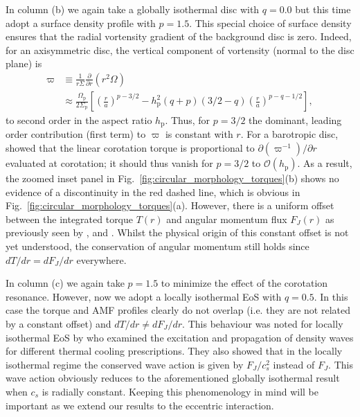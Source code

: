 In column (b) we again take a globally isothermal disc with $q = 0.0$ but this time adopt a surface density profile with $p = 1.5$. This special choice of surface density ensures that the radial vortensity gradient of the background disc is zero. Indeed, for an axisymmetric disc, the vertical component of vortensity (normal to the disc plane) is 
%
\begin{align}
\label{eq:vortensity}
    \varpi &\equiv \frac{1}{r\Sigma}\frac{\partial}{\partial r}\left(r^2 \Omega\right) \nonumber \\
    &\approx \frac{\Omega_\textrm{p}}{2\Sigma_\textrm{p}}\left[ \left(\frac{r}{a}\right)^{p-3/2}-h_\textrm{p}^2(q+p)(3/2-q)\left(\frac{r}{a}\right)^{p-q-1/2}\right],
\end{align}
%
to second order in the aspect ratio $h_\textrm{p}$. Thus, for $p=3/2$ the dominant, leading order contribution (first term) to $\varpi$ is constant with $r$. For a barotropic disc, \cite{GoldreichTremaine_1979} showed that the linear corotation torque is proportional to $\partial(\varpi^{-1})/\partial r$ evaluated at corotation; it should thus vanish for $p=3/2$ to $\mathcal{O}(h_\textrm{p})$. As a result, the zoomed inset panel in Fig.~\ref{fig:circular_morphology_torques}(b) shows no evidence of a discontinuity in the red dashed line, which is obvious in Fig.~\ref{fig:circular_morphology_torques}(a). However, there is a uniform offset between the integrated torque $T(r)$ and angular momentum flux $F_J(r)$ as previously seen by \cite{KorycanskyPollack_1993}, \cite{DongEtAl_2011} and \cite{RafikovPetrovich_2012}. Whilst the physical origin of this constant offset is not yet understood, the conservation of angular momentum still holds since $dT/dr = dF_{J}/dr$ everywhere. 

In column (c) we again take $p=1.5$ to minimize the effect of the corotation resonance. However, now we adopt a locally isothermal EoS with $q = 0.5$. In this case the torque and AMF profiles clearly do not overlap (i.e. they are not related by a constant offset) and $dT/dr \neq dF_{J}/dr$. This behaviour was noted for locally isothermal EoS by \cite{MirandaRafikov_2020} who examined the excitation and propagation of density waves for different thermal cooling prescriptions. They also showed that in the locally isothermal regime the conserved wave action is given by $F_{J}/c_s^2$ instead of $F_J$. This wave action obviously reduces to the aforementioned globally isothermal result when $c_s$ is radially constant. Keeping this phenomenology in mind will be important as we extend our results to the eccentric interaction. 


